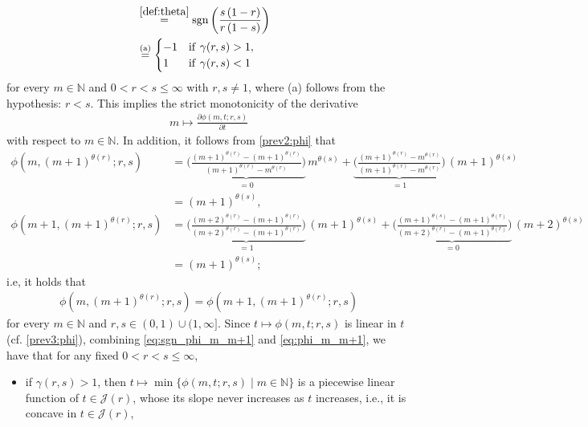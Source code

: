 \documentclass[conference, draftcls, onecolumn]{IEEEtran}
\theoremstyle{plain}
\newcommand{\sgn}{\operatorname{sgn}}
\newcommand{\thref}[1]{Theorem~\ref{#1}}
\begin{document}
\begin{IEEEproof}[Proof of \thref{th:UV}]
\begin{align}
\\
& \overset{\eqref{def:theta}}{=}
\sgn\bigg( \frac{ s \, (1 - r) }{ r \, (1 - s) } \bigg)
\\
& \overset{\text{(a)}}{=}
\begin{cases}
-1
& \mathrm{if} \ \gamma(r, s) > 1 ,
\\
1
& \mathrm{if} \ \gamma(r, s) < 1
\end{cases}
\label{eq:sgn_phi_m_m+1}
\end{align}
for every $m \in \mathbb{N}$ and $0 < r < s \le \infty$ with $r, s \neq 1$, where (a) follows from the hypothesis: $r < s$.
This implies the strict monotonicity of the derivative
\begin{align}
m \mapsto \frac{ \partial \phi(m, t; r, s) }{ \partial t }
\end{align}
with respect to $m \in \mathbb{N}$.
In addition, it follows from \eqref{prev2:phi} that
\begin{align}
\phi(m, (m+1)^{\theta( r )}; r, s)
& =
\underbrace{ \bigg( \frac{ (m+1)^{\theta( r )} - (m+1)^{\theta( r )} }{ (m+1)^{\theta( r )} - m^{\theta( r )} } \bigg) }_{ = 0 } \, m^{\theta( s )} + \underbrace{ \bigg( \frac{ (m+1)^{\theta( r )} - m^{\theta( r )} }{ (m+1)^{\theta( r )} - m^{\theta( r )} } \bigg) }_{ = 1 } \, (m+1)^{\theta( s )}
\\
& =
(m+1)^{\theta( s )} ,
\\
\phi(m+1, (m+1)^{\theta( r )}; r, s)
& =
\underbrace{ \bigg( \frac{ (m+2)^{\theta( r )} - (m+1)^{\theta( r )} }{ (m+2)^{\theta( r )} - (m+1)^{\theta( r )} } \bigg) }_{ = 1 } \, (m+1)^{\theta( s )} + \underbrace{ \bigg( \frac{ (m+1)^{\theta( s )} - (m+1)^{\theta( r )} }{ (m+2)^{\theta( r )} - (m+1)^{\theta( r )} } \bigg) }_{ = 0 } \, (m+2)^{\theta( s )}
\\
& =
(m+1)^{\theta( s )} ;
\end{align}
i.e, it holds that
\begin{align}
\phi(m, (m+1)^{\theta( r )}; r, s)
=
\phi(m+1, (m+1)^{\theta( r )}; r, s)
\label{eq:phi_m_m+1}
\end{align}
for every $m \in \mathbb{N}$ and $r, s \in (0, 1) \cup (1, \infty]$.
Since $t \mapsto \phi(m, t; r, s)$ is linear in $t$ (cf. \eqref{prev3:phi}), combining \eqref{eq:sgn_phi_m_m+1} and \eqref{eq:phi_m_m+1}, we have that for any fixed $0 < r < s \le \infty$,
\begin{itemize}
\item
if $\gamma( r, s ) > 1$, then $t \mapsto \min \{ \phi(m, t; r, s) \mid m \in \mathbb{N} \}$ is a piecewise linear function of $t \in \mathcal{J}( r )$, whose its slope never increases as $t$ increases, i.e., it is concave in $t \in \mathcal{J}( r )$,

\end{itemize}
\end{IEEEproof}
\end{document}
